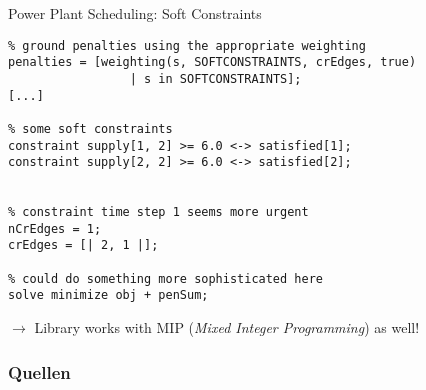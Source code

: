 \documentclass[10pt,xcolor={dvipsnames},fleqn]{beamer}
\begin{document}
\begin{frame}[fragile]{Power Plant Scheduling: Soft Constraints}
\begin{lstlisting}
% ground penalties using the appropriate weighting
penalties = [weighting(s, SOFTCONSTRAINTS, crEdges, true) 
                 | s in SOFTCONSTRAINTS];
[...]

% some soft constraints
constraint supply[1, 2] >= 6.0 <-> satisfied[1]; 
constraint supply[2, 2] >= 6.0 <-> satisfied[2]; 


% constraint time step 1 seems more urgent
nCrEdges = 1;
crEdges = [| 2, 1 |];

% could do something more sophisticated here
solve minimize obj + penSum;
\end{lstlisting}
$\rightarrow$ Library works with MIP (\emph{Mixed Integer Programming}) as well!
\end{frame}

\begin{frame}[allowframebreaks]
        \frametitle{Quellen}
        
        
\end{frame}
\end{document}
